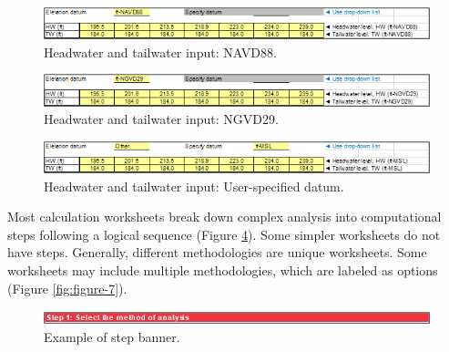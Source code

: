 \documentclass[
]{book}
\begin{document}
\begin{figure}

{\centering \includegraphics[width=1\linewidth]{images/figure3} 

}

\caption{Headwater and tailwater input: NAVD88.}\label{fig:figure-3}
\end{figure}

\begin{figure}

{\centering \includegraphics[width=1\linewidth]{images/figure4} 

}

\caption{Headwater and tailwater input: NGVD29.}\label{fig:figure-4}
\end{figure}

\begin{figure}

{\centering \includegraphics[width=1\linewidth]{images/figure5} 

}

\caption{Headwater and tailwater input: User-specified datum.}\label{fig:figure-5}
\end{figure}

Most calculation worksheets break down complex analysis into computational steps following a logical sequence (Figure \ref{fig:figure-6}). Some simpler worksheets do not have steps. Generally, different methodologies are unique worksheets. Some worksheets may include multiple methodologies, which are labeled as options (Figure \ref{fig:figure-7}).

\begin{figure}

{\centering \includegraphics[width=1\linewidth]{images/figure6} 

}

\caption{Example of step banner.}\label{fig:figure-6}
\end{figure}
\end{document}
